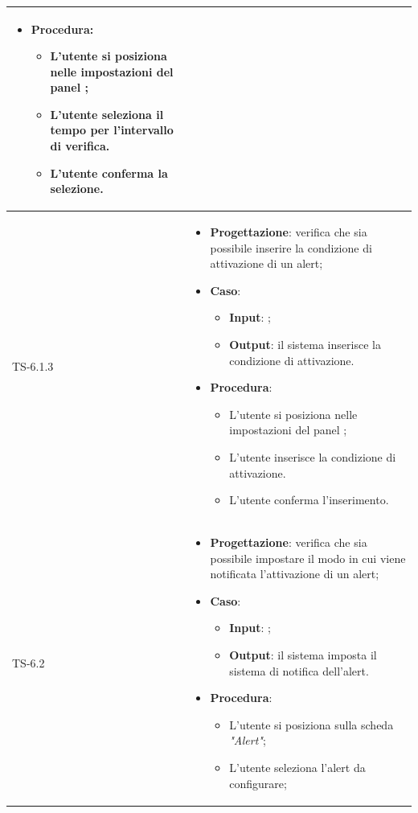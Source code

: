\begin{longtable}{|C{2.5cm}|C{13cm}|}
\begin{itemize}
\begin{itemize}
	\end{itemize}
	\item \textbf{Procedura}:
	\begin{itemize}
		\item L'utente si posiziona nelle impostazioni del panel ;
		\item L'utente seleziona il tempo per l'intervallo di verifica.
		\item L'utente conferma la selezione.
	\end{itemize} 
\end{itemize}
  \\
	\hline
	{TS-6.1.3} & 
\begin{itemize}
	\item \textbf{Progettazione}: verifica che sia possibile inserire la
	condizione di attivazione di un alert;
	\item \textbf{Caso}: 
	\begin{itemize}
		\item \textbf{Input}: ;
		\item \textbf{Output}: il sistema inserisce la condizione di attivazione.
	\end{itemize}
	\item \textbf{Procedura}:
	\begin{itemize}
		\item L'utente si posiziona nelle impostazioni del panel ;
		\item L'utente inserisce la condizione di attivazione.
		\item L'utente conferma l'inserimento.
	\end{itemize} 
\end{itemize}
	 \\
	\hline
	{TS-6.2} & 
\begin{itemize}
	\item \textbf{Progettazione}: verifica che sia possibile impostare il
	modo in cui viene notificata l'attivazione di un alert;
	\item \textbf{Caso}: 
	\begin{itemize}
		\item \textbf{Input}: ;
		\item \textbf{Output}: il sistema imposta il sistema di notifica dell'alert.
	\end{itemize}
	\item \textbf{Procedura}:
	\begin{itemize}
		\item L'utente si posiziona sulla scheda \emph{"Alert"};
		\item L'utente seleziona l'alert da configurare;

\end{itemize}
\end{itemize}
\end{longtable}
